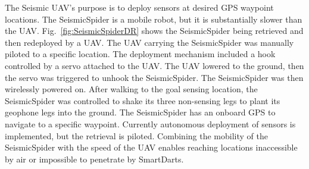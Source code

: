 The Seismic UAV's purpose is to deploy sensors at desired GPS waypoint locations. The SeismicSpider is a mobile robot, but it is substantially slower than the UAV. Fig.~\ref{fig:SeismicSpiderDR} shows the SeismicSpider being retrieved and then redeployed by a UAV. The UAV carrying the SeismicSpider was manually piloted to a specific location. The deployment mechanism included a hook controlled by a servo attached to the UAV. The UAV lowered to the ground, then the servo was triggered to unhook the SeismicSpider.  The SeismicSpider was then wirelessly powered on. 
After walking to the goal sensing location, the SeismicSpider was controlled to shake its three non-sensing legs to plant its geophone legs into the ground.  The SeismicSpider has an onboard GPS to navigate to a specific waypoint.  Currently autonomous deployment of sensors is implemented, but the retrieval is piloted. 
Combining the mobility of the SeismicSpider with the speed of the UAV enables reaching locations inaccessible by air or impossible to penetrate by SmartDarts.





